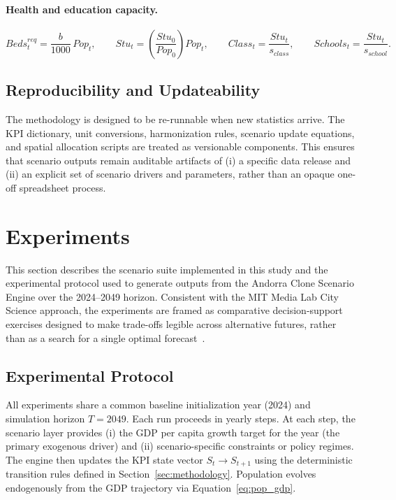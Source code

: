 \documentclass{article}
\begin{document}
\paragraph{Health and education capacity.}
\begin{equation}
Beds^{req}_t = \frac{b}{1000}\,Pop_t, \qquad
Stu_t = \left(\frac{Stu_0}{Pop_0}\right)Pop_t, \qquad
Class_t = \frac{Stu_t}{s_{class}}, \qquad Schools_t = \frac{Stu_t}{s_{school}}.
\end{equation}

\subsection{Reproducibility and Updateability}
\label{subsec:reproducibility}

The methodology is designed to be re-runnable when new statistics arrive. The
KPI dictionary, unit conversions, harmonization rules, scenario update
equations, and spatial allocation scripts are treated as versionable components.
This ensures that scenario outputs remain auditable artifacts of (i) a specific
data release and (ii) an explicit set of scenario drivers and parameters, rather
than an opaque one-off spreadsheet process.

\section{Experiments}
\label{sec:experiments}

This section describes the scenario suite implemented in this study and the
experimental protocol used to generate outputs from the Andorra Clone Scenario
Engine over the 2024--2049 horizon. Consistent with the MIT Media Lab City
Science approach, the experiments are framed as comparative decision-support
exercises designed to make trade-offs legible across alternative futures, rather
than as a search for a single optimal forecast~\cite{orii2020methodology}.

\subsection{Experimental Protocol}
\label{subsec:exp_protocol}

All experiments share a common baseline initialization year (2024) and
simulation horizon $T=2049$. Each run proceeds in yearly steps. At each step,
the scenario layer provides (i) the GDP per capita growth target for the year
(the primary exogenous driver) and (ii) scenario-specific constraints or policy
regimes. The engine then updates the KPI state vector $S_t \rightarrow S_{t+1}$
using the deterministic transition rules defined in
Section~\ref{sec:methodology}. Population evolves endogenously from the GDP
trajectory via Equation~\eqref{eq:pop_gdp}.
\end{document}
